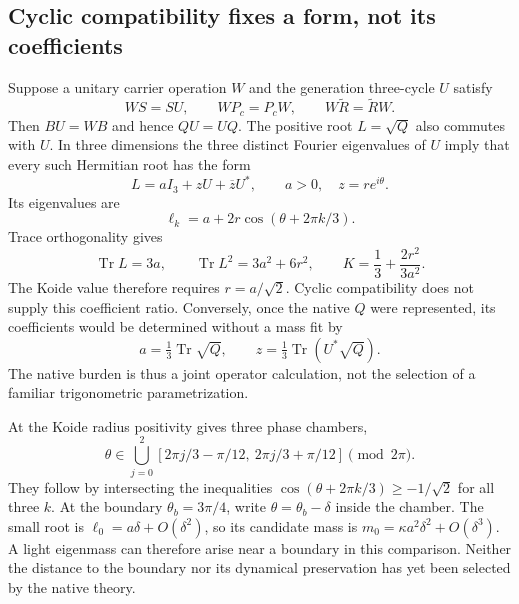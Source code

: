 \documentclass[11pt,a4paper]{article}
\begin{document}
\subsection{Cyclic compatibility fixes a form, not its coefficients}
Suppose a unitary carrier operation $W$ and the generation three-cycle
$U$ satisfy
\begin{equation}
 WS=SU,\qquad WP_c=P_cW,\qquad W\widetilde R=\widetilde RW.
\end{equation}
Then $BU=WB$ and hence $QU=UQ$. The positive root $L=\sqrt Q$
also commutes with $U$. In three dimensions the three distinct Fourier
eigenvalues of $U$ imply that every such Hermitian root has the form
\begin{equation}
 L=aI_3+zU+\overline zU^*,\qquad a>0,\quad z=re^{i\theta}.
\end{equation}
Its eigenvalues are
\begin{equation}
 \ell_k=a+2r\cos(\theta+2\pi k/3).
\end{equation}
Trace orthogonality gives
\begin{equation}
 \operatorname{Tr}L=3a,\qquad
 \operatorname{Tr}L^2=3a^2+6r^2,\qquad
 K=\frac13+\frac{2r^2}{3a^2}.
\end{equation}
The Koide value therefore requires $r=a/\sqrt2$. Cyclic compatibility
does not supply this coefficient ratio. Conversely, once the native
$Q$ were represented, its coefficients would be determined without a
mass fit by
\begin{equation}
 a=\tfrac13\operatorname{Tr}\sqrt Q,\qquad
 z=\tfrac13\operatorname{Tr}(U^*\sqrt Q).
\end{equation}
The native burden is thus a joint operator calculation, not the
selection of a familiar trigonometric parametrization.

At the Koide radius positivity gives three phase chambers,
\begin{equation}
 \theta\in\bigcup_{j=0}^2
 [2\pi j/3-\pi/12,\ 2\pi j/3+\pi/12]
 \pmod{2\pi}.
\end{equation}
They follow by intersecting the inequalities
$\cos(\theta+2\pi k/3)\geq-1/\sqrt2$ for all three $k$.
At the boundary $\theta_b=3\pi/4$, write
$\theta=\theta_b-\delta$ inside the chamber. The small root is
$\ell_0=a\delta+O(\delta^2)$, so its candidate mass is
$m_0=\kappa a^2\delta^2+O(\delta^3)$. A light eigenmass can
therefore arise near a boundary in this comparison. Neither the
distance to the boundary nor its dynamical preservation has yet been
selected by the native theory.
\end{document}
